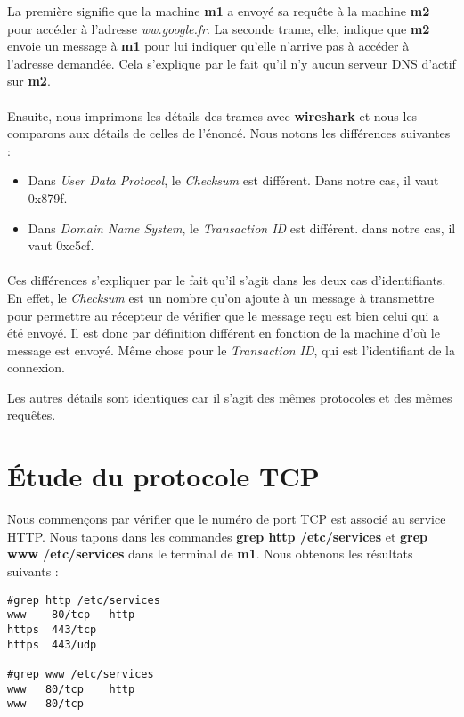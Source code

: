 \documentclass{article}
\begin{document}
La première signifie que la machine \textbf{m1} a envoyé sa requête à la machine \textbf{m2} pour accéder à l'adresse \textit{ww.google.fr}. La seconde trame, elle, indique que \textbf{m2} envoie un message à \textbf{m1} pour lui indiquer qu'elle n'arrive pas à accéder à l'adresse demandée. Cela s'explique par le fait qu'il n'y aucun serveur DNS d'actif sur \textbf{m2}.
\paragraph{}{
Ensuite, nous imprimons les détails des trames avec \textbf{wireshark} et nous les comparons aux détails de celles de l'énoncé. Nous notons les différences suivantes :
\begin{itemize}
\item Dans \textit{User Data Protocol}, le \textit{Checksum} est différent. Dans notre cas, il vaut 0x879f.
\item Dans \textit{Domain Name System}, le \textit{Transaction ID} est différent. dans notre cas, il vaut 0xc5cf.
\end{itemize}}
\paragraph{}{
 Ces différences s'expliquer par le fait qu'il s'agit dans les deux cas d'identifiants. En effet, le \textit{Checksum} est un nombre qu'on ajoute à un message à transmettre pour permettre au récepteur de vérifier que le message reçu est bien celui qui a été envoyé. Il est donc par définition différent en fonction de la machine d'où le message est envoyé. Même chose pour le \textit{Transaction ID}, qui est l'identifiant de la connexion.
 
 Les autres détails sont identiques car il s'agit des mêmes protocoles et des mêmes requêtes.} \newpage

\section{Étude du protocole TCP}

Nous commençons par vérifier que le numéro de port TCP est associé au service HTTP. Nous tapons dans les commandes \textbf{grep http /etc/services} et \textbf{grep www /etc/services} dans le terminal de \textbf{m1}. Nous obtenons les résultats suivants :
\begin{verbatim}
#grep http /etc/services
www    80/tcp   http
https  443/tcp
https  443/udp

#grep www /etc/services
www   80/tcp    http
www   80/tcp
\end{verbatim}
\end{document}
